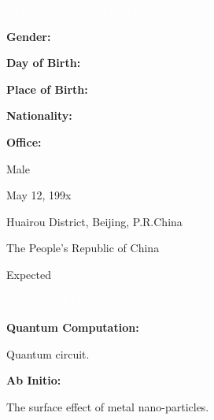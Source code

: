 \documentclass[12pt,a4paper,utf8]{report}
\begin{document}
\begin{minipage}[t]{16cm}
    \begin{snugshade}{\textcolor{white}{\textsf{\quad 
        PERSONAL INFORMATIONS
    \qquad}}}\end{snugshade}
\end{minipage}\par
\vspace{0.2cm}
    \begin{minipage}[t]{4cm}
        \qquad \textbf{Gender:}\par
        \qquad \textbf{Day of Birth:}\par
        \qquad \textbf{Place of Birth:}\par
        \qquad \textbf{Nationality:}\par
        \qquad \textbf{Office:}\par
    \end{minipage}
    \begin{minipage}[t]{12cm}
        Male \par
        May 12, 199x \par
        Huairou District, Beijing, P.R.China \par
        The People's Republic of China \par
        Expected \par
    \end{minipage}\par
\vspace{0.4cm}

\begin{minipage}[t]{16cm}
    \begin{snugshade}{\textcolor{white}{\textsf{\quad 
        RESEARCH INTERESTS
    \qquad}}}\end{snugshade}
\end{minipage}\par
\vspace{0.2cm}\hspace{0.5cm}
    \begin{minipage}[t]{15.0cm}
        {\textbf{Quantum Computation:}}\par
        \quad Quantum circuit. \par
    \vspace{0.2cm}
        {\textbf{Ab Initio:}}\par
        \quad The surface effect of metal nano-particles.
    \end{minipage}\par
\vspace{0.4cm}
\end{document}
